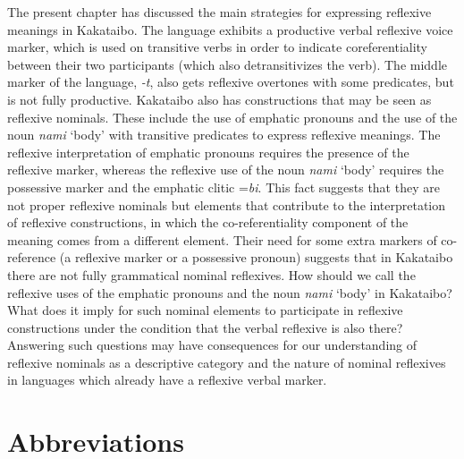 \documentclass[output=paper,colorlinks,citecolor=brown,modfonts,nonflat]{langscibook}
\begin{document}
The present chapter has discussed the main strategies for expressing reflexive meanings in Kakataibo. The language exhibits a productive verbal reflexive voice marker, which is used on transitive verbs in order to indicate coreferentiality between their two participants (which also detransitivizes the verb). The middle marker of the language, \textit{{}-t}, also gets reflexive overtones with some predicates, but is not fully productive. Kakataibo also has constructions that may be seen as reflexive nominals. These include the use of emphatic pronouns and the use of the noun \textit{nami} ‘body’ with transitive predicates to express reflexive meanings. The reflexive interpretation of emphatic pronouns requires the presence of the reflexive marker, whereas the reflexive use of the noun \textit{nami} ‘body’ requires the possessive marker and the emphatic clitic =\textit{bi}. This fact suggests that they are not proper reflexive nominals  but elements that contribute to the interpretation of reflexive constructions, in which the co-referentiality component of the meaning comes from a different element. Their need for some extra markers of co-reference (a reflexive marker or a possessive pronoun) suggests that in Kakataibo there are not fully grammatical nominal reflexives. How should we call the reflexive uses of the emphatic pronouns and the noun \textit{nami} ‘body’ in Kakataibo? What does it imply for such nominal elements to participate in reflexive constructions under the condition that the verbal reflexive is also there? Answering such questions may have consequences for our understanding of reflexive nominals as a descriptive category and the nature of nominal reflexives in languages which already have a reflexive verbal marker. 

\section*{Abbreviations}
\end{document}
